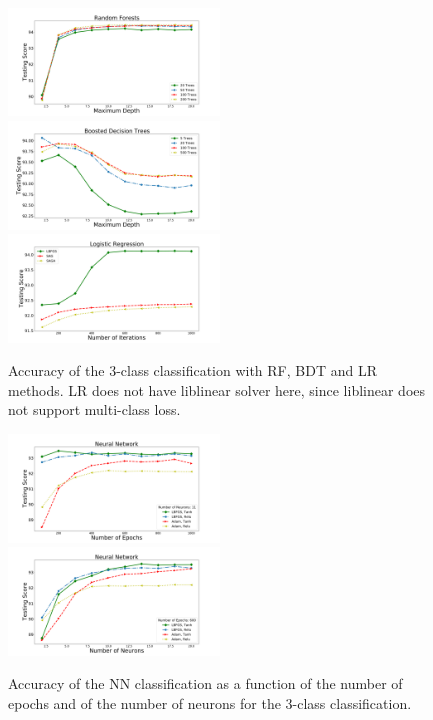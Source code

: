\begin{figure}[h]
\centering
\includegraphics[width=0.5\textwidth]{plots/rf_train_multi.pdf}\\
\includegraphics[width=0.5\textwidth]{plots/bdt_train_multi.pdf}
\includegraphics[width=0.5\textwidth]{plots/lr_train_multi.pdf}
\caption{Accuracy of the 3-class classification with RF, BDT and LR  methods. LR does not have liblinear solver here, since liblinear 
does not support multi-class loss.
}
\label{fig:tree_multi}
\end{figure}

\begin{figure}[h]
\centering
\includegraphics[width=0.5\textwidth]{plots/nn_epoch_train_multi.pdf}\\
\includegraphics[width=0.5\textwidth]{plots/nn_neuron_train_multi.pdf}
\caption{Accuracy of the NN classification as a function of the number of epochs and of the number of neurons
 for the 3-class classification. 
 }
\label{fig:nets_multi}
\end{figure}


